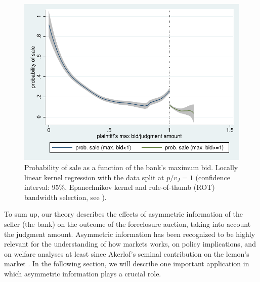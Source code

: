 \documentclass[11pt,twopage]{article}
\begin{document}
\begin{figure}
  \begin{center}
    \includegraphics[width=0.6
    \textwidth]{graphics/simple_discontinuity}
    \caption{Probability of sale as a function of the bank's maximum
      bid. Locally linear kernel regression with the data split at
      $p/v_J=1$ (confidence interval: 95\%, Epanechnikov kernel and
      rule-of-thumb (ROT) bandwidth selection, see
      \cite{fan1996local}).\label{fig:discontinuity-data}}
  \end{center}
\end{figure}


To sum up, our theory describes the effects of asymmetric information
of the seller (the bank) on the outcome of the foreclosure auction,
taking into account the judgment amount. Asymmetric information has
been recognized to be highly relevant for the understanding of how
markets works, on policy implications, and on welfare analyses at
least since Akerlof's seminal contribution on the lemon's market
\citep{akerlof1970market}. In the following section, we will describe
one important application in which asymmetric information plays a
crucial role.
\end{document}

